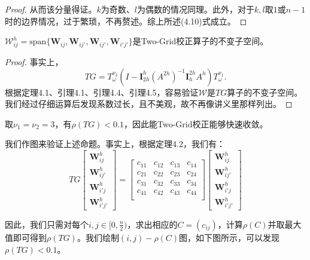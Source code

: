 \documentclass[lang=cn,10pt]{elegantbook}
\begin{document}
\begin{proof}
  从而该分量得证。$k$为奇数、$l$为偶数的情况同理。此外，对于$k,l$取$1$或$n-1$时的边界情况，过于繁琐，不再赘述。综上所述(4.10)式成立。
\end{proof}

\begin{theorem}
  $\mathcal{W}_{ij}^h=\text{span}\{\mathbf{W}_{ij},\mathbf{W}_{ij'},\mathbf{W}_{ij'},\mathbf{W}_{i'j'}\}$是Two-Grid校正算子的不变子空间。
\end{theorem}

\begin{proof}
  事实上，
  \begin{equation*}
    TG=T_\omega^{\nu_2}(I-\mathbf{I}_{2h}^h(A^{2h})^{-1}\mathbf{I}_h^{2h}A^h)T_\omega^{\nu_1}.
  \end{equation*}
  根据定理4.1、引理4.1、引理4.4、引理4.5，容易验证$\mathcal{W}$是$TG$算子的不变子空间。我们经过仔细运算后发现系数过长，且不美观，故不再像讲义里那样列出。
\end{proof}

\begin{proposition}
  取$\nu_1=\nu_2=3$，有$\rho(TG)<0.1$，因此能Two-Grid校正能够快速收敛。
\end{proposition}

我们作图来验证上述命题。事实上，根据定理4.2，我们有：
\begin{equation}
  TG\begin{bmatrix}
    \mathbf{W}_{ij}^h\\
    \mathbf{W}_{ij'}^h\\
    \mathbf{W}_{i'j}^h\\
    \mathbf{W}_{i'j'}^h
  \end{bmatrix} = 
  \begin{bmatrix}
    c_{11} & c_{12} & c_{13} & c_{14}\\
    c_{21} & c_{22} & c_{23} & c_{24}\\
    c_{31} & c_{32} & c_{33} & c_{34}\\
    c_{41} & c_{42} & c_{43} & c_{44}\\
  \end{bmatrix}
  \begin{bmatrix}
    \mathbf{W}_{ij}^h\\
    \mathbf{W}_{ij'}^h\\
    \mathbf{W}_{i'j}^h\\
    \mathbf{W}_{i'j'}^h
  \end{bmatrix}
\end{equation}

因此，我们只需对每个$i,j\in[0,\frac{n}{2})$，求出相应的$C=(c_{ij})$，计算$\rho(C)$并取最大值即可得到$\rho(TG)$。我们绘制$(i,j)-\rho(C)$图，如下图所示，可以发现$\rho(TG)<0.1$。
\end{document}
